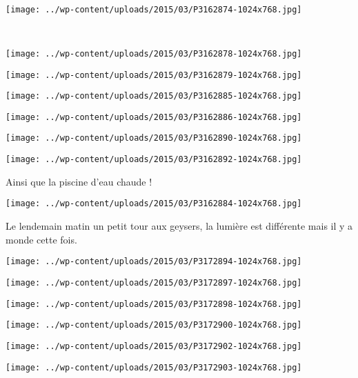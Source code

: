 \pagebreak
~\\
\begin{center} \texttt{[image: ../wp-content/uploads/2015/03/P3162874-1024x768.jpg]} \end{center}
~
\begin{center} \texttt{[image: ../wp-content/uploads/2015/03/P3162878-1024x768.jpg]} \end{center}
\begin{center} \texttt{[image: ../wp-content/uploads/2015/03/P3162879-1024x768.jpg]} \end{center}
\begin{center} \texttt{[image: ../wp-content/uploads/2015/03/P3162885-1024x768.jpg]} \end{center}
\begin{center} \texttt{[image: ../wp-content/uploads/2015/03/P3162886-1024x768.jpg]} \end{center}
\begin{center} \texttt{[image: ../wp-content/uploads/2015/03/P3162890-1024x768.jpg]} \end{center}
\begin{center} \texttt{[image: ../wp-content/uploads/2015/03/P3162892-1024x768.jpg]} \end{center}

 Ainsi que la piscine d'eau chaude ! 
\begin{center} \texttt{[image: ../wp-content/uploads/2015/03/P3162884-1024x768.jpg]} \end{center}
\vspace{-\topsep}

\pagebreak
  Le lendemain matin un petit tour aux geysers, la lumière est différente mais il y a monde cette fois. 
\begin{center} \texttt{[image: ../wp-content/uploads/2015/03/P3172894-1024x768.jpg]} \end{center}
\begin{center} \texttt{[image: ../wp-content/uploads/2015/03/P3172897-1024x768.jpg]} \end{center}
\begin{center} \texttt{[image: ../wp-content/uploads/2015/03/P3172898-1024x768.jpg]} \end{center}
\begin{center} \texttt{[image: ../wp-content/uploads/2015/03/P3172900-1024x768.jpg]} \end{center}
\begin{center} \texttt{[image: ../wp-content/uploads/2015/03/P3172902-1024x768.jpg]} \end{center}
\vfill
\begin{center} \texttt{[image: ../wp-content/uploads/2015/03/P3172903-1024x768.jpg]} \end{center}
\vspace{-\topsep}
\vspace{-0.75mm}

